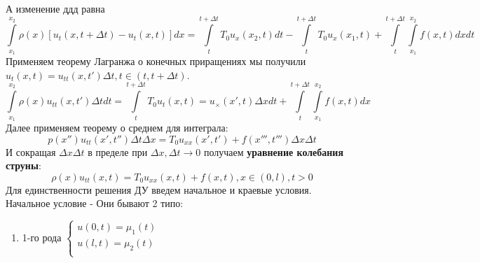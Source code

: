 А изменение ддд равна
$$ \int\limits_{x_1}^{x_2} \rho (x) [u_t(x, t + \Delta t) - u_t(x, t)]dx = \int\limits_{t}^{t + \Delta t} T_0 u_x (x_2, t) dt - \int\limits_{t}^{t+ \Delta t} T_0 u_x (x_1, t) + \int\limits_{t}^{t + \Delta t} \int\limits_{x_1}^{x_2} f(x, t)dxdt  $$
Применяем теорему Лагранжа о конечных приращениях мы получили $u_t(x, t) = u_{tt}(x, t') \Delta t, t \in (t, t + \Delta t)$.
$$ \int\limits_{x_{1}}^{x_{2}}\rho(x)u_{tt}(x,t')\Delta tdt=\int\limits_{t}^{t+\Delta t}T_{0}u_{t}(x,t)=u_{\times}(x',t)\Delta xdt+\int\limits_{t}^{t+\Delta t}\int\limits_{x_{1}}^{x_{2}}f(x,t)dx $$
Далее применяем теорему о среднем для интеграла:
$$ p(x'') u_{tt} (x', t'') \Delta t \Delta x = T_0u_{xx}(x', t') + f(x''', t''') \Delta x \Delta t $$
И сокращая $ \Delta x \Delta t $ в пределе при $\Delta x, \Delta t \rightarrow 0$ получаем \textbf{уравнение колебания струны}:
$$ \rho (x) u_{tt}(x, t) = T_0 u_{xx} (x, t) + f(x, t), x \in (0, l), t > 0 $$
Для единственности решения ДУ введем начальное и краевые условия. Начальное условие - Они бывают 2 типо:
\begin{enumerate}
    \item 1-го рода $ \begin{cases}
                  u(0, t) = \mu_1(t) \\
                  u(l, t) = \mu_2(t) \\
              \end{cases} $

\end{enumerate}